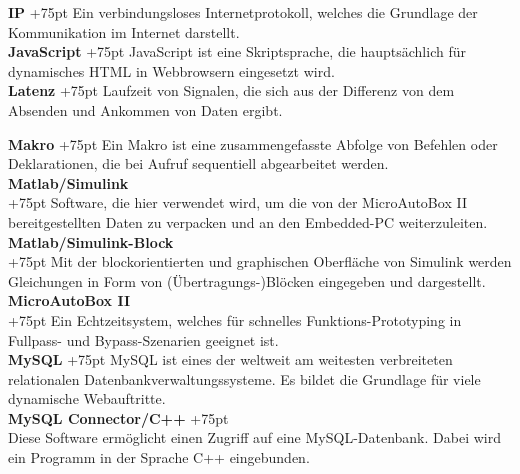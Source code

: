 \documentclass[fontsize = 12pt, paper = a4]{scrreprt}
\begin{document}
\textbf{IP}
\hangindent+75pt 
\hspace*{18.75mm}
Ein verbindungsloses Internetprotokoll, welches die Grundlage der Kommunikation im Internet darstellt.\\

\textbf{JavaScript}
\hangindent+75pt 
\hspace*{2.5mm}
JavaScript ist eine Skriptsprache, die hauptsächlich für dynamisches HTML in Webbrowsern eingesetzt wird. \\

\textbf{Latenz}
\hangindent+75pt 
\hspace*{10mm}
Laufzeit von Signalen, die sich aus der Differenz von dem Absenden und Ankommen von Daten ergibt.\\

\begin{spacing}{0.95} 

\textbf{Makro}
\hangindent+75pt 
\hspace*{9.75mm}
Ein Makro ist eine zusammengefasste Abfolge von Befehlen oder Deklarationen, die bei Aufruf sequentiell abgearbeitet werden.\\

\textbf{Matlab/Simulink} \\
\hangindent+75pt  
Software, die hier verwendet wird, um die von der MicroAutoBox II bereitgestellten Daten zu verpacken und an den Embedded-PC weiterzuleiten.\\

\textbf{Matlab/Simulink-Block} \\
\hangindent+75pt  
Mit der blockorientierten und graphischen Oberfläche von Simulink werden Gleichungen in Form von (Übertragungs-)Blöcken eingegeben und dargestellt.\\

\textbf{MicroAutoBox II} \\
\hangindent+75pt  
Ein Echtzeitsystem, welches für schnelles Funktions-Prototyping in Fullpass- und Bypass-Szenarien geeignet ist.\\


\textbf{MySQL}
\hangindent+75pt  
\hspace*{7.5mm}
MySQL ist eines der weltweit am weitesten verbreiteten relationalen Datenbankverwaltungssysteme. Es bildet die Grundlage für viele dynamische Webauftritte.\\

\textbf{MySQL Connector/C++}
\hangindent+75pt 
\\
Diese Software ermöglicht einen Zugriff auf eine MySQL-Datenbank. Dabei wird ein Programm in der Sprache C++ eingebunden.\\


\end{spacing}
\end{document}

